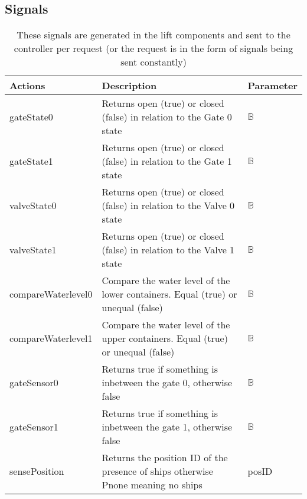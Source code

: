 \subsection{Signals}
\begin{table}[htbp]
	\centering
	\begin{tabular}{lp{6cm}l}
		\toprule
		\textbf{Actions} & \textbf{Description} & \textbf{Parameter} \\
		\hline
		gateState0 & Returns open (true) or closed (false) in relation to the Gate 0 state &  $ \mathbb{B} $ \\
		gateState1 & Returns open (true) or closed (false) in relation to the Gate 1 state &  $ \mathbb{B} $ \\
		valveState0 & Returns open (true) or closed (false) in relation to the Valve 0 state &  $ \mathbb{B} $ \\
		valveState1 & Returns open (true) or closed (false) in relation to the Valve 1 state &  $ \mathbb{B} $ \\
		compareWaterlevel0 & Compare the water level of the lower containers. Equal (true) or unequal (false) &  $ \mathbb{B} $ \\
		compareWaterlevel1 & Compare the water level of the upper containers. Equal (true) or unequal (false) &  $ \mathbb{B} $ \\
		gateSensor0 &  Returns true if something is inbetween the gate 0, otherwise false &  $ \mathbb{B} $ \\
		gateSensor1 &  Returns true if something is inbetween the gate 1, otherwise false &  $ \mathbb{B} $ \\
		sensePosition  & Returns the position ID of the presence of ships otherwise Pnone meaning no ships & posID \\
		\bottomrule
	\end{tabular}%
	\caption{These signals are generated in the lift components and sent to the controller per request (or the request is in the form of signals being sent constantly)}
	\label{tab:addlabel}%
\end{table}%

